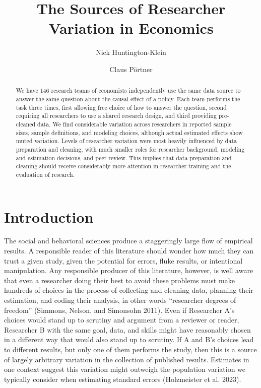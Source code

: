 \documentclass[
  letterpaper,
  DIV=11,
  numbers=noendperiod]{scrartcl}
\title{The Sources of Researcher Variation in Economics}
\author{Nick Huntington-Klein \and Claus Pörtner}
\date{}
\begin{document}
\maketitle
\begin{abstract}
We have 146 research teams of economists independently use the same data
source to answer the same question about the causal effect of a policy.
Each team performs the task three times, first allowing free choice of
how to answer the question, second requiring all researchers to use a
shared research design, and third providing pre-cleaned data. We find
considerable variation across researchers in reported sample sizes,
sample definitions, and modeling choices, although actual estimated
effects show muted variation. Levels of researcher variation were most
heavily influenced by data preparation and cleaning, with much smaller
roles for researcher background, modeling and estimation decisions, and
peer review. This implies that data preparation and cleaning should
receive considerably more attention in researcher training and the
evaluation of research.
\end{abstract}
\ifdefined\Shaded\renewenvironment{Shaded}{\begin{tcolorbox}[breakable, sharp corners, frame hidden, interior hidden, borderline west={3pt}{0pt}{shadecolor}, boxrule=0pt, enhanced]}{\end{tcolorbox}}\fi

\hypertarget{introduction}{%
\section{Introduction}\label{introduction}}

The social and behavioral sciences produce a staggeringly large flow of
empirical results. A responsible reader of this literature should wonder
how much they can trust a given study, given the potential for errors,
fluke results, or intentional manipulation. Any responsible producer of
this literature, however, is well aware that even a researcher doing
their best to avoid these problems must make hundreds of choices in the
process of collecting and cleaning data, planning their estimation, and
coding their analysis, in other words ``researcher degrees of freedom''
(Simmons, Nelson, and Simonsohn 2011). Even if Researcher A's choices
would stand up to scrutiny and argument from a reviewer or reader,
Researcher B with the same goal, data, and skills might have reasonably
chosen in a different way that would also stand up to scrutiny. If A and
B's choices lead to different results, but only one of them performs the
study, then this is a source of largely arbitrary variation in the
collection of published results. Estimates in one context suggest this
variation might outweigh the population variation we typically consider
when estimating standard errors (Holzmeister et al. 2023).
\end{document}
